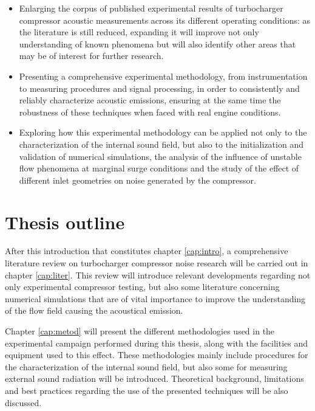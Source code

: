 \begin{itemize}
	\item Enlarging the corpus of published experimental results of turbocharger compressor acoustic measurements across its different operating conditions: as the literature is still reduced, expanding it will improve not only understanding of known phenomena but will also identify other areas that may be of interest for further research.

	\item Presenting a comprehensive experimental methodology, from instrumentation to measuring procedures and signal processing, in order to consistently and reliably characterize acoustic emissions, ensuring at the same time the robustness of these techniques when faced with real engine conditions.

	\item Exploring how this experimental methodology can be applied not only to the characterization of the internal sound field, but also to the initialization and validation of numerical simulations, the analysis of the influence of unstable flow phenomena at marginal surge conditions and the study of the effect of different inlet geometries on noise generated by the compressor.
\end{itemize}

\section{Thesis outline}

After this introduction that constitutes chapter \ref{cap:intro}, a comprehensive literature review on turbocharger compressor noise research will be carried out in chapter \ref{cap:liter}. This review will introduce relevant developments regarding not only experimental compressor testing, but also some literature concerning numerical simulations that are of vital importance to improve the understanding of the flow field causing the acoustical emission.

Chapter \ref{cap:metod} will present the different methodologies used in the experimental campaign performed during this thesis, along with the facilities and equipment used to this effect. These methodologies mainly include procedures for the characterization of the internal sound field, but also some for measuring external sound radiation will be introduced. Theoretical background, limitations and best practices regarding the use of the presented techniques will be also discussed.

